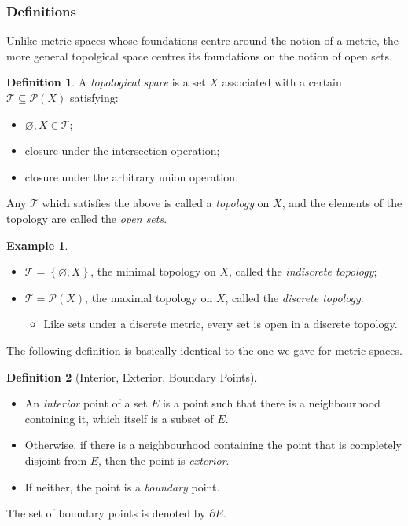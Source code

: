 \documentclass{article}
\theoremstyle{definition}
\newtheorem{defn}{Definition}[subsubsection]
\newtheorem{example}{Example}[subsubsection]
\begin{document}
\subsubsection{Definitions}
Unlike metric spaces whose foundations centre around the notion of a metric, the more general topolgical space centres its foundations on the notion of open sets.
\begin{defn}
	A \emph{topological space} is a set $X$ associated with a certain $\mathcal{T}\subseteq\mathscr{P}(X)$ satisfying:
	\begin{itemize}
		\item $\varnothing,X\in\mathcal{T}$;
		\item closure under the intersection operation;
		\item closure under the arbitrary union operation.
	\end{itemize}
	Any $\mathcal{T}$ which satisfies the above is called a \emph{topology} on $X$, and the elements of the topology are called the \emph{open sets}.
\end{defn}
\begin{example}
	$ $\\
	\begin{itemize}
		\item $\mathcal{T}=\left\{\varnothing,X\right\}$, the minimal topology on $X$, called the \emph{indiscrete topology};
		\item $\mathcal{T}=\mathscr{P}(X)$, the maximal topology on $X$, called the \emph{discrete topology}. 
		\begin{itemize}
			\item Like sets under a discrete metric, every set is open in a discrete topology.
		\end{itemize}
	\end{itemize}
\end{example}
The following definition is basically identical to the one we gave for metric spaces.
\begin{defn}[Interior, Exterior, Boundary Points]
	$ $\\
	\begin{itemize}
		\item An \emph{interior} point of a set $E$ is a point such that there is a neighbourhood containing it, which itself is a subset of $E$.
		\item Otherwise, if there is a neighbourhood containing the point that is completely disjoint from $E$, then the point is \emph{exterior}.
		\item If neither, the point is a \emph{boundary} point.
	\end{itemize}
	The set of boundary points is denoted by $\partial E$.
\end{defn}
\end{document}
